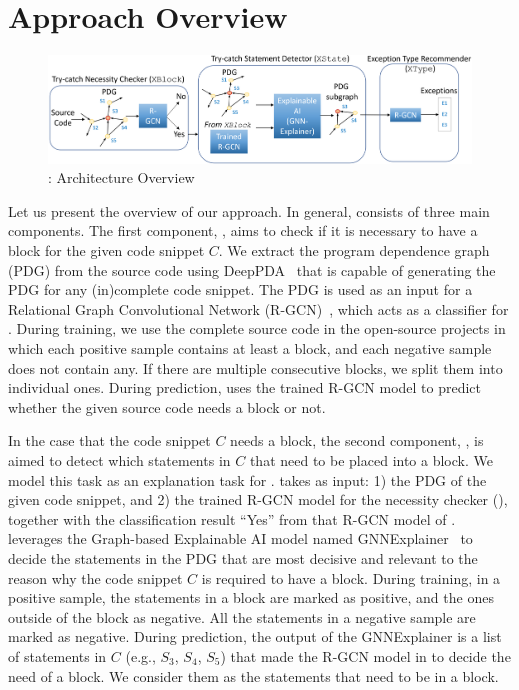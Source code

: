 \section{Approach Overview}
\label{sec:overview}

\begin{figure}[t]
\begin{center}
\includegraphics[width=5.4in]{overview.png}
\vspace{-10pt}
\caption{{\tool}: Architecture Overview}
\label{overview}
\end{center}
\end{figure}

Let us present the overview of our approach. In general, {\tool}
consists of three main components. The first component, {\xblock},
aims to check if it is necessary to have a  block for
the given code snippet $C$. We extract the program dependence graph
(PDG) from the source code using DeepPDA~\cite{icse23} that is capable
of generating the PDG for any (in)complete code snippet. The PDG is
used as an input for a Relational Graph Convolutional Network
(R-GCN)~\cite{yi}, which acts as a classifier for {\xblock}. During
training, we use the complete source code in the open-source projects
in which each positive sample contains at least a 
block, and each negative sample does not contain any. If there are
multiple consecutive blocks, we split them into individual
ones. During prediction, {\xblock} uses the trained R-GCN model to predict
whether the given source code needs a  block or not.

In the case that the code snippet $C$ needs a  block,
the second component, {\xstate}, is aimed to detect which statements
in $C$ that need to be placed into a  block.  We model
this task as an explanation task for {\xblock}. {\xstate} takes as
input: 1) the PDG of the given code snippet, and 2) the trained R-GCN
model for the  necessity checker ({\xblock}), together
with the classification result ``Yes'' from that R-GCN model of
{\xblock}. {\xstate} leverages the Graph-based Explainable AI model
named GNNExplainer~\cite{GNNExplainer} to decide the statements in the
PDG that are most decisive and relevant to the reason why the code snippet
$C$ is required to have a  block. During training, in
a positive sample, the statements in a  block are
marked as positive, and the ones outside of the block as negative. All
the statements in a negative sample are marked as negative. During
prediction, the output of the GNNExplainer is a list of statements in
$C$ (e.g., $S_3$, $S_4$, $S_5$) that made the R-GCN model in {\xblock}
to decide the need of a  block. We consider them as
the statements that need to be in a  block.

